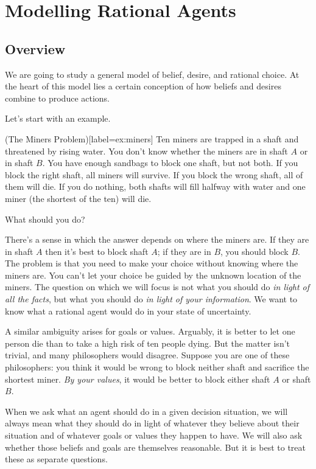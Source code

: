 \chapter{Modelling Rational Agents}\label{ch:overview}

\section{Overview}

We are going to study a general model of belief, desire, and rational choice. At
the heart of this model lies a certain conception of how beliefs and desires
combine to produce actions.

Let's start with an example.
%
\begin{example}(The Miners Problem)[label=ex:miners]
  Ten miners are trapped in a shaft and threatened by rising water. You don't
  know whether the miners are in shaft $A$ or in shaft $B$. You have enough
  sandbags to block one shaft, but not both. If you block the right shaft, all
  miners will survive. If you block the wrong shaft, all of them will die. If
  you do nothing, both shafts will fill halfway with water and one miner (the
  shortest of the ten) will die.
\end{example}

What should you do?

There's a sense in which the answer depends on where the miners are. If they are
in shaft $A$ then it's best to block shaft $A$; if they are in $B$, you should block
$B$. The problem is that you need to make your choice without knowing where the
miners are. You can't let your choice be guided by the unknown location of the
miners. The question on which we will focus is not what you should do \emph{in
  light of all the facts}, but what you should do \emph{in light of your
  information}. We want to know what a rational agent would do in your state of
uncertainty.

A similar ambiguity arises for goals or values. Arguably, it is better to let
one person die than to take a high risk of ten people dying. But the matter
isn't trivial, and many philosophers would disagree. Suppose you are one of
these philosophers: you think it would be wrong to block neither shaft and
sacrifice the shortest miner. \emph{By your values}, it would be better to block
either shaft $A$ or shaft $B$.

When we ask what an agent should do in a given decision situation, we will always
mean what they should do in light of whatever they believe about their situation
and of whatever goals or values they happen to have. We will also ask whether
those beliefs and goals are themselves reasonable. But it is best to treat these
as separate questions.

